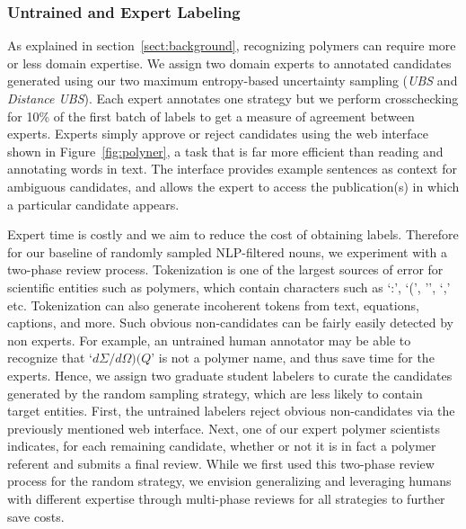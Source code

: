 \subsubsection{Untrained and Expert Labeling}
As explained in section~\ref{sect:background}, recognizing polymers can require more or less domain expertise.
We assign two domain experts to annotated candidates generated using our two maximum entropy-based uncertainty sampling (\textit{UBS} and \textit{Distance UBS}). 
Each expert annotates one strategy but we perform crosschecking for 10\% of the first batch of labels to get a measure of agreement between experts. 
Experts simply approve or reject candidates using the web interface shown in Figure~\ref{fig:polyner},
a task that is far more efficient than reading and annotating words in text.
The interface
provides example sentences as context for ambiguous candidates,
and allows the expert to access the publication(s) in which a particular candidate
appears. %

Expert time is costly and we aim to reduce the cost of obtaining labels.
Therefore for our baseline of randomly sampled NLP-filtered nouns, we experiment with a two-phase review process.
Tokenization is one of the largest sources of error for scientific entities such as polymers, 
which contain characters such as `:', `(',
'\textendash', `,' etc. 
Tokenization can also generate incoherent tokens from text, equations, captions, and more.
Such obvious non-candidates can be fairly easily detected by non experts.
For example, an untrained human annotator may be able to recognize that `$d\Sigma/d\Omega)(Q$' is not a polymer name, and thus save time for the experts.
Hence, we assign two graduate student labelers to curate the candidates generated by the random sampling strategy, which are less likely to contain target entities.
First, the untrained labelers reject obvious non-candidates via the previously mentioned web interface. 
Next, one of our expert polymer scientists indicates, for each remaining
candidate, whether or not it is in fact a polymer referent and submits a final review.
While we first used this two-phase review process for the random strategy, 
we envision generalizing and leveraging humans with different expertise through multi-phase reviews for all strategies to further save costs.



